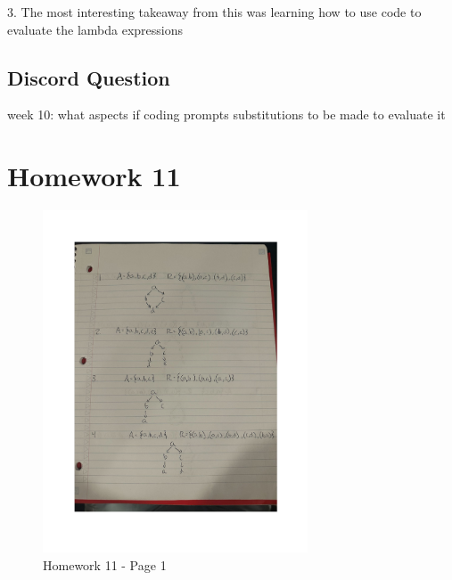 \documentclass{article}
\theoremstyle{plain}
\theoremstyle{definition}
\theoremstyle{remark}
\begin{document}
3. The most interesting takeaway from this was learning how to use code to evaluate the lambda expressions

\subsection{Discord Question}

week 10: what aspects if coding prompts substitutions to be made to evaluate it

\section{Homework 11}\label{homework11}

\begin{figure}[H]
  \centering
  \includegraphics[width=0.7\textwidth, page=1]{HW11.pdf}
  \caption{Homework 11 - Page 1}
  \label{fig:homework11_page1}
\end{figure}
\end{document}
